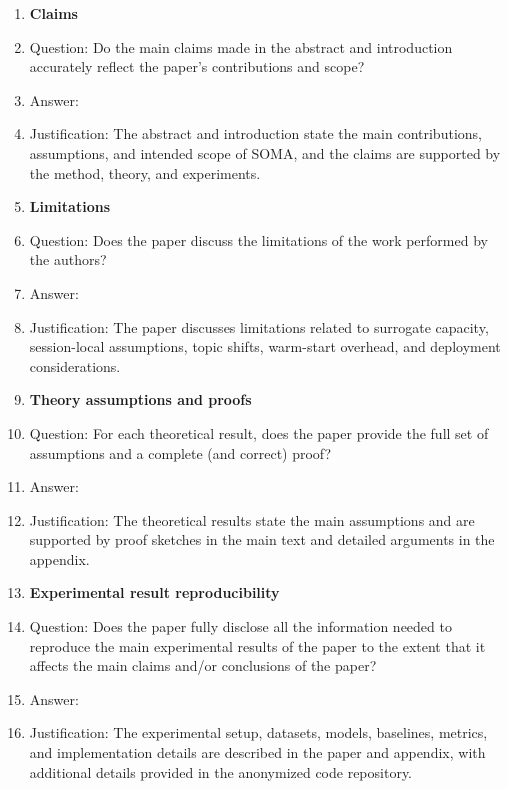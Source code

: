 


\begin{enumerate}

\item {\bf Claims}
    \item[] Question: Do the main claims made in the abstract and introduction accurately reflect the paper's contributions and scope?
    \item[] Answer: \answerYes{}
    \item[] Justification: The abstract and introduction state the main contributions, assumptions, and intended scope of SOMA, and the claims are supported by the method, theory, and experiments.

\item {\bf Limitations}
    \item[] Question: Does the paper discuss the limitations of the work performed by the authors?
    \item[] Answer: \answerYes{}
    \item[] Justification: The paper discusses limitations related to surrogate capacity, session-local assumptions, topic shifts, warm-start overhead, and deployment considerations.

\item {\bf Theory assumptions and proofs}
    \item[] Question: For each theoretical result, does the paper provide the full set of assumptions and a complete (and correct) proof?
    \item[] Answer: \answerYes{}
    \item[] Justification: The theoretical results state the main assumptions and are supported by proof sketches in the main text and detailed arguments in the appendix.

\item {\bf Experimental result reproducibility}
    \item[] Question: Does the paper fully disclose all the information needed to reproduce the main experimental results of the paper to the extent that it affects the main claims and/or conclusions of the paper?
    \item[] Answer: \answerYes{}
    \item[] Justification: The experimental setup, datasets, models, baselines, metrics, and implementation details are described in the paper and appendix, with additional details provided in the anonymized code repository.


\end{enumerate}
